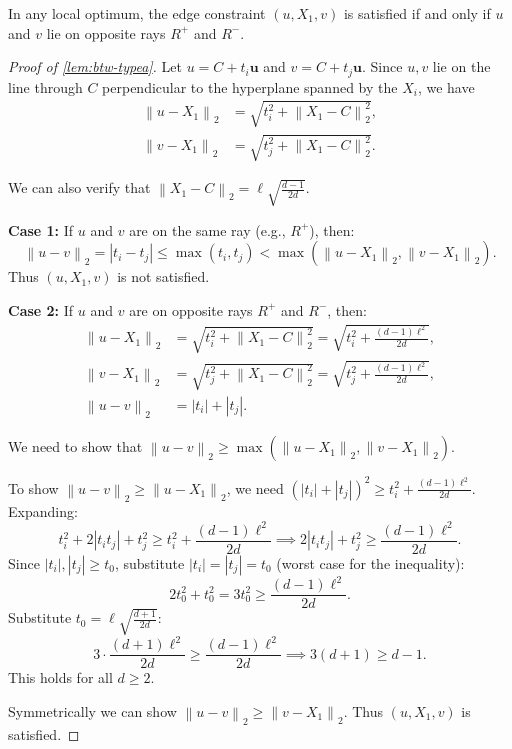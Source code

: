 \documentclass[10pt,a4paper]{amsart}
\newcommand{\norm}[1]{\left\| #1 \right\|}
\begin{document}
\begin{lemma}\label{lem:btw-typea}
In any local optimum, the edge constraint $(u, X_1, v)$ is satisfied if and only if $u$ and $v$ lie on opposite rays $R^+$ and $R^-$.
\end{lemma}

\begin{proof}[Proof of \cref{lem:btw-typea}]
Let $u = C + t_i\mathbf{u}$ and $v = C + t_j\mathbf{u}$. Since $u, v$ lie on the line through $C$ perpendicular to the hyperplane spanned by the $X_i$, we have
\begin{align*}
    \norm{u - X_1}_2 &= \sqrt{t_i^2 + \norm{X_1 - C}_2^2}, \\
    \norm{v - X_1}_2 &= \sqrt{t_j^2 + \norm{X_1 - C}_2^2}.
\end{align*}

We can also verify that $\norm{X_1 - C}_2 = \ell \sqrt{\frac{d-1}{2d}}$.

\textbf{Case 1:} If $u$ and $v$ are on the same ray (e.g., $R^+$), then:
\[
\norm{u - v}_2 = |t_i - t_j| \leq \max(t_i, t_j) < \max(\norm{u - X_1}_2, \norm{v - X_1}_2).
\]
Thus $(u, X_1, v)$ is not satisfied.

\textbf{Case 2:} If $u$ and $v$ are on opposite rays $R^+$ and $R^-$, then:
\begin{align*}
  \norm{u - X_1}_2 &= \sqrt{t_i^2 + \norm{X_1 - C}_2^2} = \sqrt{t_i^2 + \frac{(d-1)\ell^2}{2d}}, \\
  \norm{v - X_1}_2 &= \sqrt{t_j^2 + \norm{X_1 - C}_2^2} = \sqrt{t_j^2 + \frac{(d-1)\ell^2}{2d}}, \\
  \norm{u - v}_2 &= |t_i| + |t_j|.
\end{align*}

We need to show that $\norm{u - v}_2 \geq \max(\norm{u - X_1}_2, \norm{v - X_1}_2)$.

To show $\norm{u - v}_2 \geq \norm{u - X_1}_2$, we need $(|t_i| + |t_j|)^2 \geq t_i^2 + \frac{(d-1)\ell^2}{2d}$.  
Expanding:
\[
t_i^2 + 2 |t_i t_j| + t_j^2 \geq t_i^2 + \frac{(d-1)\ell^2}{2d} \implies 2 |t_i t_j| + t_j^2 \geq \frac{(d-1)\ell^2}{2d}.
\]
Since $|t_i|, |t_j| \geq t_0$, substitute $|t_i| = |t_j| = t_0$ (worst case for the inequality):
\[
2t_0^2 + t_0^2 = 3t_0^2 \geq \frac{(d-1)\ell^2}{2d}.
\]
Substitute $t_0 = \ell \sqrt{\frac{d+1}{2d}}$:
\[
3 \cdot \frac{(d+1)\ell^2}{2d} \geq \frac{(d-1)\ell^2}{2d} \implies 3(d+1) \geq d-1.
\]
This holds for all $d \geq 2$.

Symmetrically we can show $\norm{u - v}_2 \geq \norm{v - X_1}_2$. Thus $(u, X_1, v)$ is satisfied.
\end{proof}
\end{document}
